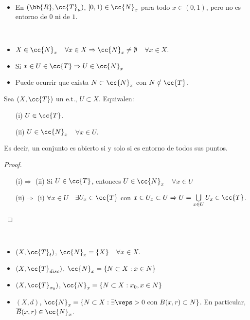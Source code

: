 \begin{ejemplo}\
    \begin{itemize}
        \item En $(\bb{R}, \cc{T}_u)$, $[0,1)\in \cc{N}_x$ para todo $x\in (0,1)$, pero no es entorno de $0$ ni de $1$.
    \end{itemize}
    \endsquare
\end{ejemplo}

\begin{observacion}\
    \begin{itemize}
        \item $X\in \cc{N}_x$\ \ $\forall x \in X\Rightarrow \cc{N}_x\neq \emptyset$\ \ $\forall x\in X$.
        \item Si $x\in U \in \cc{T}\Rightarrow U\in \cc{N}_x$
        \item Puede ocurrir que exista $N\subset \cc{N}_x$ con $N\notin \cc{T}$.
    \end{itemize}
    \endsquare
\end{observacion}

\begin{prop}
    Sea $(X,\cc{T})$ un e.t., $U\subset X$. Equivalen:
    \begin{enumerate}
        \item[(i)] $U\in \cc{T}$.
        \item[(ii)] $U\in \cc{N}_x$\ \ $\forall x \in U$.
    \end{enumerate}

    Es decir, un conjunto es abierto si y solo si es entorno de todos sus puntos.

    \begin{proof}\
        \begin{enumerate}
            \item[(i)$\Rightarrow$ (ii)] Si $U\in \cc{T}$, entonces $U\in \cc{N}_x$\ \ $\forall x\in U$
            \item[(ii)$\Rightarrow$ (i)] $\forall x \in U $\ \ $\exists U_x \in \cc{T}$ con $x\in U_x\subset U \Rightarrow U = \bigcup\limits_{x\in U}U_x \in \cc{T}$.
        \end{enumerate}
    \end{proof}
\end{prop}

\begin{ejemplo}\
    \begin{itemize}   
        \item $(X,\cc{T}_t)$, $\cc{N}_x=\{X\}$\ \ $\forall x \in X$.
        \item $(X,\cc{T}_{disc})$, $\cc{N}_x=\{N\subset X : x\in N\}$
        \item $(X,\cc{T}_{x_0})$, $\cc{N}_x = \{N \subset X : x_0,x\in N\}$
        \item $(X,d)$, $\cc{N}_x = \{N\subset X : \exists \veps > 0 \text{ con } B(x,r)\subset N\}$. En particular, $\overline{B}(x,r)\in \cc{N}_x$.
    \end{itemize}
    \endsquare
\end{ejemplo}

